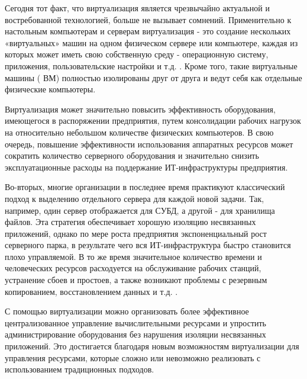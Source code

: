 {\actuality}
Сегодня тот факт, что виртуализация является чрезвычайно актуальной и востребованной технологией, больше не вызывает сомнений. Применительно к настольным компьютерам и серверам виртуализация - это создание нескольких «виртуальных» машин на одном физическом сервере или компьютере, каждая из которых может иметь свою собственную среду - операционную систему, приложения, пользовательские настройки и т.д. . Кроме того, такие виртуальные машины ( ВМ) полностью изолированы друг от друга и ведут себя как отдельные физические компьютеры.

Виртуализация может значительно повысить эффективность оборудования, имеющегося в распоряжении предприятия, путем консолидации рабочих нагрузок на относительно небольшом количестве физических компьютеров. В свою очередь, повышение эффективности использования аппаратных ресурсов может сократить количество серверного оборудования и значительно снизить эксплуатационные расходы на поддержание ИТ-инфраструктуры предприятия.

Во-вторых, многие организации в последнее время практикуют классический подход к выделению отдельного сервера для каждой новой задачи. Так, например, один сервер отображается для СУБД, а другой - для хранилища файлов. Эта стратегия обеспечивает хорошую изоляцию несвязанных приложений, однако по мере роста предприятия экспоненциальный рост серверного парка, в результате чего вся ИТ-инфраструктура быстро становится плохо управляемой. В то же время значительное количество времени и человеческих ресурсов расходуется на обслуживание рабочих станций, устранение сбоев и простоев, а также возникают проблемы с резервным копированием, восстановлением данных и т.д. .

С помощью виртуализации можно организовать более эффективное централизованное управление вычислительными ресурсами и упростить администрирование оборудования без нарушения изоляции несвязанных приложений. Это достигается благодаря новым возможностям виртуализации для управления ресурсами, которые сложно или невозможно реализовать с использованием традиционных подходов.


